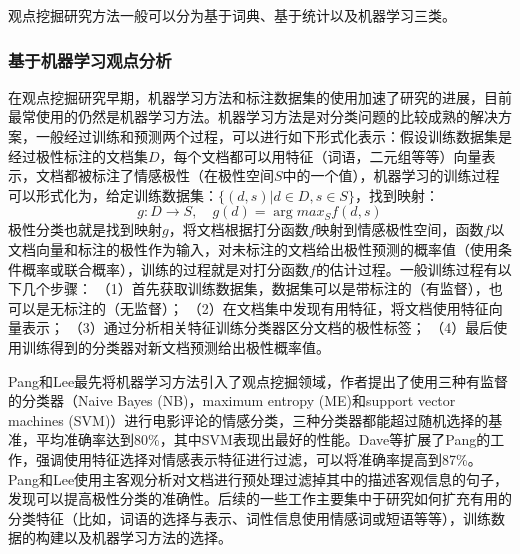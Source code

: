 观点挖掘研究方法一般可以分为基于词典、基于统计以及机器学习三类。
\subsubsection{基于机器学习观点分析}
在观点挖掘研究早期，机器学习方法和标注数据集的使用加速了研究的进展，目前最常使用的仍然是机器学习方法。机器学习方法是对分类问题的比较成熟的解决方案，一般经过训练和预测两个过程，可以进行如下形式化表示：假设训练数据集是经过极性标注的文档集$D$，每个文档都可以用特征（词语，二元组等等）向量表示，文档都被标注了情感极性（在极性空间$S$中的一个值），机器学习的训练过程可以形式化为，给定训练数据集：$ \{(d,s)|d \in D,s \in S\} $，找到映射：
\begin{equation}
g:D \rightarrow S,\quad g(d)=\arg max_S f(d,s)
\end{equation}
极性分类也就是找到映射$ g $，将文档根据打分函数$ f $映射到情感极性空间，函数$ f $以文档向量和标注的极性作为输入，对未标注的文档给出极性预测的概率值（使用条件概率或联合概率），训练的过程就是对打分函数$ f $的估计过程。一般训练过程有以下几个步骤：
（1）首先获取训练数据集，数据集可以是带标注的（有监督），也可以是无标注的（无监督）；
（2）在文档集中发现有用特征，将文档使用特征向量表示；
（3）通过分析相关特征训练分类器区分文档的极性标签；
（4）最后使用训练得到的分类器对新文档预测给出极性概率值。

Pang和Lee最先将机器学习方法引入了观点挖掘领域，作者提出了使用三种有监督的分类器（Naive Bayes (NB)，maximum entropy (ME)和support vector machines (SVM)）进行电影评论的情感分类，三种分类器都能超过随机选择的基准，平均准确率达到80\%，其中SVM表现出最好的性能。Dave等扩展了Pang的工作，强调使用特征选择对情感表示特征进行过滤，可以将准确率提高到87\%。Pang和Lee使用主客观分析对文档进行预处理过滤掉其中的描述客观信息的句子，发现可以提高极性分类的准确性。后续的一些工作主要集中于研究如何扩充有用的分类特征（比如，词语的选择与表示、词性信息使用情感词或短语等等），训练数据的构建以及机器学习方法的选择。

